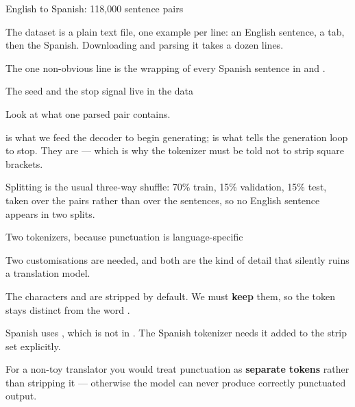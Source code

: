 \documentclass[aspectratio=169,11pt,t]{beamer}
\begin{document}
\begin{frame}[shrink=25]{English to Spanish: 118,000 sentence pairs}
{\fontsize{9.4}{12.6}\selectfont\color{fg2}The dataset is a plain text file, one example per line: an English sentence, a tab, then the Spanish. Downloading and parsing it takes a dozen lines.\par}\vskip 4pt
{\fontsize{9.4}{12.6}\selectfont\color{fg2}The one non-obvious line is the wrapping of every Spanish sentence in \inlinecode{[start]} and \inlinecode{[end]}.\par}\vskip 4pt
\end{frame}

\begin{frame}[shrink=25]{The seed and the stop signal live in the data}
{\fontsize{9.4}{12.6}\selectfont\color{fg2}Look at what one parsed pair contains.\par}\vskip 4pt
{\fontsize{9.4}{12.6}\selectfont\color{fg2}\inlinecode{[start]} is what we feed the decoder to begin generating; \inlinecode{[end]} is what tells the generation loop to stop. They are  --- which is why the tokenizer must be told not to strip square brackets.\par}\vskip 4pt
{\fontsize{9.4}{12.6}\selectfont\color{fg2}Splitting is the usual three-way shuffle: 70\% train, 15\% validation, 15\% test, taken over the pairs rather than over the sentences, so no English sentence appears in two splits.\par}\vskip 4pt
\end{frame}

\begin{frame}[shrink=25]{Two tokenizers, because punctuation is language-specific}
{\fontsize{9.4}{12.6}\selectfont\color{fg2}Two customisations are needed, and both are the kind of detail that silently ruins a translation model.\par}\vskip 4pt
\begin{ibullets}
\item The characters \inlinecode{[} and \inlinecode{]} are stripped by default. We must \textbf{keep} them, so the token  stays distinct from the word .
\item Spanish uses , which is not in . The Spanish tokenizer needs it added to the strip set explicitly.
\end{ibullets}
\begin{iband}[signal]
For a non-toy translator you would treat punctuation as \textbf{separate tokens} rather than stripping it --- otherwise the model can never produce correctly punctuated output.
\end{iband}
\end{frame}
\end{document}
